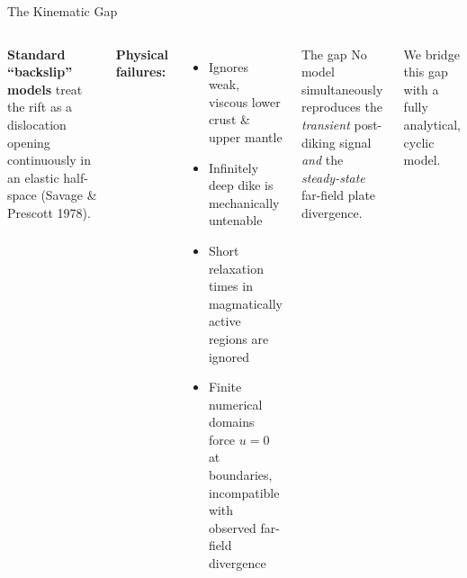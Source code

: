 \documentclass[aspectratio=169]{beamer}
\begin{document}
\begin{frame}{The Kinematic Gap}
  \begin{columns}
      \textbf{Standard ``backslip'' models} treat the rift as a dislocation
      opening continuously in an elastic half-space (Savage \& Prescott 1978).

      \vspace{0.5em}
      \textbf{Physical failures:}
      \begin{itemize}
        \item Ignores weak, viscous lower crust \& upper mantle
        \item Infinitely deep dike is mechanically untenable
        \item Short relaxation times in magmatically active regions are ignored
        \item Finite numerical domains force $u=0$ at boundaries,
              incompatible with observed far-field divergence
      \end{itemize}

      \begin{alertblock}{The gap}
        No model simultaneously reproduces the \emph{transient} post-diking
        signal \emph{and} the \emph{steady-state} far-field plate divergence.
      \end{alertblock}
      \vspace{0.5em}
      We bridge this gap with a fully analytical, cyclic model.
  \end{columns}
\end{frame}
\end{document}

